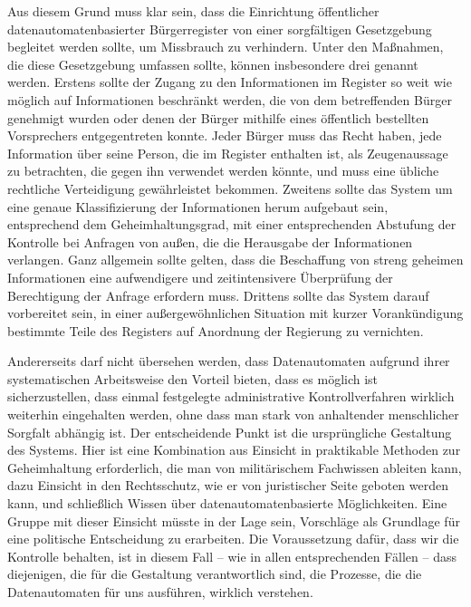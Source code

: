{Aus diesem Grund muss klar sein, dass die Einrichtung öffentlicher datenautomatenbasierter Bürgerregister von einer sorgfältigen Gesetzgebung begleitet werden sollte, um Missbrauch zu verhindern. Unter den Maßnahmen, die diese Gesetzgebung umfassen sollte, können insbesondere drei genannt werden. Erstens sollte der Zugang zu den Informationen im Register so weit wie möglich auf Informationen beschränkt werden, die von dem betreffenden Bürger genehmigt wurden oder denen der Bürger mithilfe eines öffentlich bestellten Vorsprechers entgegentreten konnte. Jeder Bürger muss das Recht haben, jede Information über seine Person, die im Register enthalten ist, als Zeugenaussage zu betrachten, die gegen ihn verwendet werden könnte, und muss eine übliche rechtliche Verteidigung gewährleistet bekommen. Zweitens sollte das System um eine genaue Klassifizierung der Informationen herum aufgebaut sein, entsprechend dem Geheimhaltungsgrad, mit einer entsprechenden Abstufung der Kontrolle bei Anfragen von außen, die die Herausgabe der Informationen verlangen. Ganz allgemein sollte gelten, dass die Beschaffung von streng geheimen Informationen eine aufwendigere und zeitintensivere Überprüfung der Berechtigung der Anfrage erfordern muss. Drittens sollte das System darauf vorbereitet sein, in einer außergewöhnlichen Situation mit kurzer Vorankündigung bestimmte Teile des Registers auf Anordnung der Regierung zu vernichten.

Andererseits darf nicht übersehen werden, dass Datenautomaten aufgrund ihrer systematischen Arbeitsweise den Vorteil bieten, dass es möglich ist sicherzustellen, dass einmal festgelegte administrative Kontrollverfahren wirklich weiterhin eingehalten werden, ohne dass man stark von anhaltender menschlicher Sorgfalt abhängig ist. Der entscheidende Punkt ist die ursprüngliche Gestaltung des Systems. Hier ist eine Kombination aus Einsicht in praktikable Methoden zur Geheimhaltung erforderlich, die man von militärischem Fachwissen ableiten kann, dazu Einsicht in den Rechtsschutz, wie er von juristischer Seite geboten werden kann, und schließlich Wissen über datenautomatenbasierte Möglichkeiten. Eine Gruppe mit dieser Einsicht müsste in der Lage sein, Vorschläge als Grundlage für eine politische Entscheidung zu erarbeiten. Die Voraussetzung dafür, dass wir die Kontrolle behalten, ist in diesem Fall -- wie in allen entsprechenden Fällen -- dass diejenigen, die für die Gestaltung verantwortlich sind, die Prozesse, die die Datenautomaten für uns ausführen, wirklich verstehen.
}


